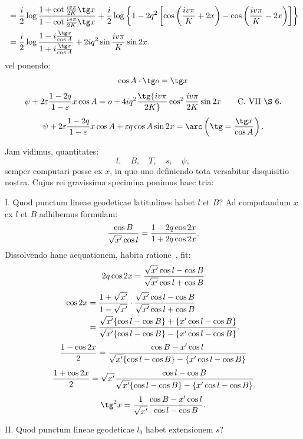 \begingroup\small
\[
\begin{aligned}
&={i\over2}\log{1+\cot{iv\pi\over2K}\tg x\over1-\cot{iv\pi\over2K}\tg x}
+{i\over2}\log\left\{1-2q^2\left[\cos\left({iv\pi\over K}+2x\right)-\cos\left({iv\pi\over K}-2x\right)\right]\right\}\\
&={i\over2}\log{1-i{\tg x\over\cos A}\over1+i{\tg x\over\cos A}}
+2iq^2\sin{iv\pi\over K}\sin2x.
\end{aligned}
\]
vel ponendo:
\[
 \cos A\cdot\tg o=\tg x
\]
\[
 \psi+2\varepsilon{1-2q\over1-\varepsilon}x\cos A
 =o+4iq^2\tg{iv\pi\over2K}\cos^2{iv\pi\over2K}\sin2x
 \qquad\text{C. VII \S\ 6.}
\]
\[
 \psi+2\varepsilon{1-2q\over1-\varepsilon}x\cos A+\varepsilon q\cos A\sin2x
 =\arc\left(\tg={\tg x\over\cos A}\right).
\]


Jam vidimus, quantitates:
\[
 l,\quad B,\quad T,\quad s,\quad \psi,
\]
semper computari posse ex $x$, in quo uno definiendo tota versabitur disquisitio nostra.
Cujus rei gravissima specimina ponimus haec tria:

I. Quod punctum lineae geodeticae latitudines habet $l$ et $B$?
Ad computandum $x$ ex $l$ et $B$ adhibemus formulam:
\[
 {\cos B\over\sqrt{x'}\cos l}={1-2q\cos2x\over1+2q\cos2x}.
\]
Dissolvendo hanc aequationem, habita ratione \,, fit:
\[
 2q\cos2x={\sqrt{x'}\cos l-\cos B\over\sqrt{x'}\cos l+\cos B}
\]
\[
\begin{aligned}
\cos2x&={1+\sqrt{x'}\over1-\sqrt{x'}}\cdot{\sqrt{x'}\cos l-\cos B\over\sqrt{x'}\cos l+\cos B}\\
&={\sqrt{x'}\{\cos l-\cos B\}+\{x'\cos l-\cos B\}
\over
\sqrt{x'}\{\cos l-\cos B\}-\{x'\cos l-\cos B\}}.
\end{aligned}
\]
\[
 {1-\cos2x\over2}={\cos B-x'\cos l\over \sqrt{x'}\{\cos l-\cos B\}-\{x'\cos l-\cos B\}}
\]
\[
 {1+\cos2x\over2}=\sqrt{x'}{\cos l-\cos B\over \sqrt{x'}\{\cos l-\cos B\}-\{x'\cos l-\cos B\}}
\]
\[
 \tg^2x={1\over\sqrt{x'}}{\cos B-x'\cos l\over\cos l-\cos B}.
\]

II. Quod punctum lineae geodeticae $l_0$ habet extensionem $s$?
\endgroup

